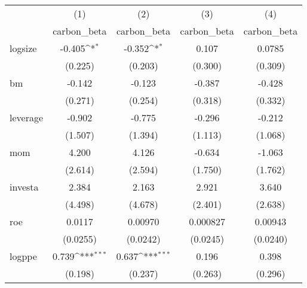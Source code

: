 {
\def\sym#1{\ifmmode^{#1}\else\(^{#1}\)\fi}
\begin{tabular}{l*{4}{c}}
\hline\hline
                    &\multicolumn{1}{c}{(1)}&\multicolumn{1}{c}{(2)}&\multicolumn{1}{c}{(3)}&\multicolumn{1}{c}{(4)}\\
                    &\multicolumn{1}{c}{carbon\_beta}&\multicolumn{1}{c}{carbon\_beta}&\multicolumn{1}{c}{carbon\_beta}&\multicolumn{1}{c}{carbon\_beta}\\
\hline
logsize             &      -0.405\sym{*}  &      -0.352\sym{*}  &       0.107         &      0.0785         \\
                    &     (0.225)         &     (0.203)         &     (0.300)         &     (0.309)         \\
[1em]
bm                  &      -0.142         &      -0.123         &      -0.387         &      -0.428         \\
                    &     (0.271)         &     (0.254)         &     (0.318)         &     (0.332)         \\
[1em]
leverage            &      -0.902         &      -0.775         &      -0.296         &      -0.212         \\
                    &     (1.507)         &     (1.394)         &     (1.113)         &     (1.068)         \\
[1em]
mom                 &       4.200         &       4.126         &      -0.634         &      -1.063         \\
                    &     (2.614)         &     (2.594)         &     (1.750)         &     (1.762)         \\
[1em]
investa             &       2.384         &       2.163         &       2.921         &       3.640         \\
                    &     (4.498)         &     (4.678)         &     (2.401)         &     (2.638)         \\
[1em]
roe                 &      0.0117         &     0.00970         &    0.000827         &     0.00943         \\
                    &    (0.0255)         &    (0.0242)         &    (0.0245)         &    (0.0240)         \\
[1em]
logppe              &       0.739\sym{***}&       0.637\sym{***}&       0.196         &       0.398         \\
                    &     (0.198)         &     (0.237)         &     (0.263)         &     (0.296)         \\

\end{tabular}}
